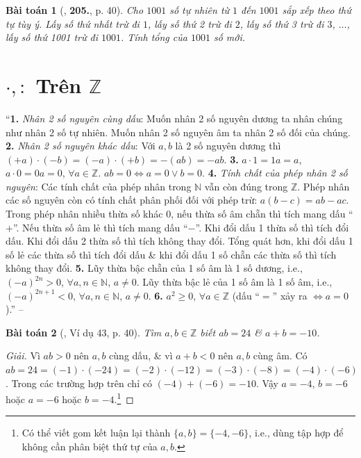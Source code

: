 \documentclass{article}
\numberwithin{equation}{section}
\newtheorem{baitoan}{Bài toán}
\begin{document}
\begin{baitoan}[\cite{Tuyen_Toan_6}, \textbf{205.}, p. 40]
	Cho $1001$ số tự nhiên từ $1$ đến $1001$ sắp xếp theo thứ tự tùy ý. Lấy số thứ nhất trừ đi $1$, lấy số thứ 2 trừ đi $2$, lấy số thứ 3 trừ đi $3$, $\ldots$, lấy số thứ 1001 trừ đi $1001$. Tính tổng của $1001$ số mới.
\end{baitoan}


\section{$\cdot,:$ Trên $\mathbb{Z}$}
``\textbf{1.} \textit{Nhân 2 số nguyên cùng dấu}: Muốn nhân 2 số nguyên dương ta nhân chúng như nhân 2 số tự nhiên. Muốn nhân 2 số nguyên âm ta nhân 2 số đối của chúng. \textbf{2.} \textit{Nhân 2 số nguyên khác dấu}: Với $a,b$ là 2 số nguyên dương thì $(+a)\cdot(-b) = (-a)\cdot(+b) = -(ab) = -ab$. \textbf{3.} $a\cdot1 = 1a = a$, $a\cdot0 = 0a = 0$, $\forall a\in\mathbb{Z}$. $ab = 0\Leftrightarrow a = 0\lor b = 0$. \textbf{4.} \textit{Tính chất của phép nhân 2 số nguyên}: Các tính chất của phép nhân trong $\mathbb{N}$ vẫn còn đúng trong $\mathbb{Z}$. Phép nhân các số nguyên còn có tính chất phân phối đối với phép trừ: $a(b - c) = ab - ac$. Trong phép nhân nhiều thừa số khác $0$, nếu thừa số âm chẵn thì tích mang dấu ``$+$''. Nếu thừa số âm lẻ thì tích mang dấu ``$-$''. Khi đổi dấu 1 thừa số thì tích đổi dấu. Khi đổi dấu 2 thừa số thì tích không thay đổi. Tổng quát hơn, khi đổi dấu 1 số lẻ các thừa số thì tích đổi dấu \& khi đổi dấu 1 số chẵn các thừa số thì tích không thay đổi. \textbf{5.} Lũy thừa bậc chẵn của 1 số âm là 1 số dương, i.e., $(-a)^{2n} > 0$, $\forall a,n\in\mathbb{N}$, $a\ne 0$. Lũy thừa bậc lẻ của 1 số âm là 1 số âm, i.e., $(-a)^{2n + 1} < 0$, $\forall a,n\in\mathbb{N}$, $a\ne 0$. \textbf{6.} $a^2\ge 0$, $\forall a\in\mathbb{Z}$ (dấu ``$=$'' xảy ra $\Leftrightarrow a = 0$).'' -- \cite[Chap. II, \S4, p. 40]{Tuyen_Toan_6}

\begin{baitoan}[\cite{Tuyen_Toan_6}, Ví dụ 43, p. 40]
	Tìm $a,b\in\mathbb{Z}$ biết $ab = 24$ \& $a + b = -10$.
\end{baitoan}

\begin{proof}[Giải]
	Vì $ab > 0$ nên $a,b$ cùng dấu, \& vì $a + b < 0$ nên $a,b$ cùng âm. Có $ab = 24 = (-1)\cdot(-24) = (-2)\cdot(-12) = (-3)\cdot(-8) = (-4)\cdot(-6)$. Trong các trường hợp trên chỉ có $(-4) + (-6) = -10$. Vậy $a = -4$, $b = -6$ hoặc $a = -6$ hoặc $b = -4$.\footnote{Có thể viết gom kết luận lại thành $\{a,b\} = \{-4,-6\}$, i.e., dùng tập hợp để không cần phân biệt thứ tự của $a,b$.}
\end{proof}
\end{document}

